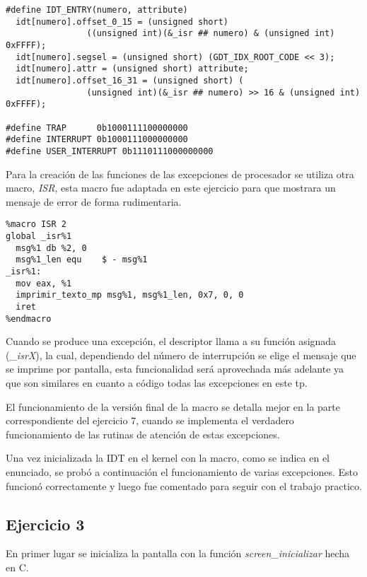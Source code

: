 \begin{lstlisting}
#define IDT_ENTRY(numero, attribute)
  idt[numero].offset_0_15 = (unsigned short)
                ((unsigned int)(&_isr ## numero) & (unsigned int) 0xFFFF);
  idt[numero].segsel = (unsigned short) (GDT_IDX_ROOT_CODE << 3);
  idt[numero].attr = (unsigned short) attribute;
  idt[numero].offset_16_31 = (unsigned short) (
                (unsigned int)(&_isr ## numero) >> 16 & (unsigned int) 0xFFFF);

#define TRAP      0b1000111100000000
#define INTERRUPT 0b1000111000000000
#define USER_INTERRUPT 0b1110111000000000
\end{lstlisting}

Para la creación de las funciones de las excepciones de procesador se utiliza
otra macro, {\it ISR\/}, esta macro fue adaptada en este ejercicio para que
mostrara un mensaje de error de forma rudimentaria.

\begin{lstlisting}
%macro ISR 2
global _isr%1
  msg%1 db %2, 0
  msg%1_len equ    $ - msg%1
_isr%1:
  mov eax, %1
  imprimir_texto_mp msg%1, msg%1_len, 0x7, 0, 0
  iret
%endmacro
\end{lstlisting}

Cuando se produce una excepción, el descriptor llama a su función asignada
({\it _isrX\/}), la cual, dependiendo del número de interrupción se elige el
mensaje que se imprime por pantalla, esta funcionalidad será aprovechada más
adelante ya que son similares en cuanto a código todas las excepciones en este
tp.

El funcionamiento de la versión final de la macro se detalla mejor en la parte
correspondiente del ejercicio 7, cuando se implementa el verdadero
funcionamiento de las rutinas de atención
de estas excepciones.

Una vez inicializada la IDT en el kernel con la macro, como se indica en el
enunciado, se probó a continuación el funcionamiento de varias excepciones.
Esto funcionó correctamente y luego fue comentado para seguir con el trabajo
practico.



\subsection{Ejercicio 3}

En primer lugar se inicializa la pantalla con la función
{\it screen_inicializar\/} hecha en C.

